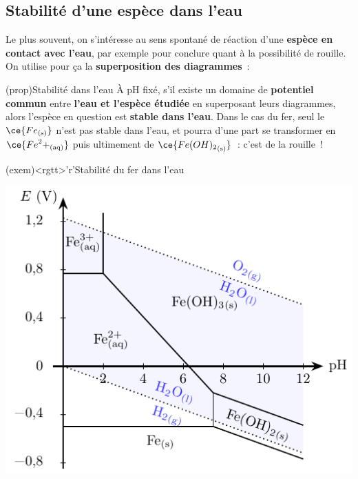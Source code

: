 \documentclass[../../main/main.tex]{subfiles}
\begin{document}
\subsection{Stabilité d'une espèce dans l'eau}
Le plus souvent, on s'intéresse au sens spontané de réaction d'une
\textbf{espèce en contact avec l'eau}, par exemple pour conclure quant à la
possibilité de rouille. On utilise pour ça la \textbf{superposition des
	diagrammes}~:
\begin{tcbraster}[raster equal height=rows, raster columns=2]
  \begin{tcb*}(prop){Stabilité dans l'eau}
    À pH fixé, s'il existe un domaine de \textbf{potentiel commun} entre
    \textbf{l'eau et l'espèce étudiée} en superposant leurs diagrammes, alors
    l'espèce en question est \textbf{stable dans l'eau}.
    \bigbreak
    Dans le cas du fer, seul le $\ce{Fe_{\rm(s)}}$ n'est pas stable dans l'eau,
    et pourra d'une part se transformer en $\ce{{Fe}^2+_{\rm(aq)}}$ puis
    ultimement de $\ce{{Fe(OH)_2}_{\rm(s)}}$~: c'est de la rouille~!
  \end{tcb*}
  \begin{tcb*}(exem)<rgtt>'r'{Stabilité du fer dans l'eau}
    \begin{center}
      \includegraphics[width=\linewidth]{eph_fer-eau}
    \end{center}
  \end{tcb*}
\end{tcbraster}
\end{document}
